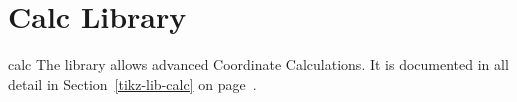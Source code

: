 \section{Calc Library}

\begin{tikzlibrary}{calc}
  The library allows advanced Coordinate Calculations. It is documented in all detail in Section~\ref{tikz-lib-calc} on page~\pageref{tikz-lib-calc}.
\end{tikzlibrary}

